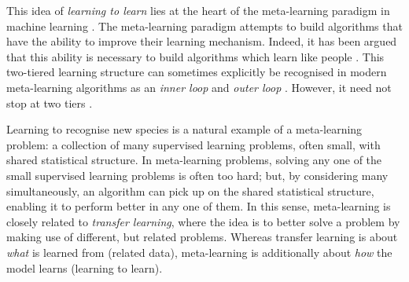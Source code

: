 \documentclass[12pt, twoside]{report}
\begin{document}
This idea of \emph{learning to learn} lies at the heart of the meta-learning paradigm in machine learning \parencite{Schmidhuber:1987:Evolutionary_Principles_in_Self-Referential_Learning,Thrun:1998:Learning_to_Learn}.
The meta-learning paradigm attempts to build algorithms that have the ability to improve their learning mechanism.
Indeed, it has been argued that this ability is necessary to build algorithms which learn like people \parencite{Lake:2015:Human-Level_Concept_Learning_Through_Probabilistic,Lake:2017:Building_Machines_That_Learn_and}.
This two-tiered learning structure can sometimes explicitly be recognised in modern meta-learning algorithms as an \emph{inner loop} and \emph{outer loop} \parencite{Andrychowicz:2016:Learning_to_Learn_by_Gradient,Finn:2017:Model-Agnostic_Meta-Learning_for_Fast_Adaptation,Grant:2018:Recasting_Gradient-Based_Meta-Learning_as_Hierarchical}.
However, it need not stop at two tiers \parencite{Schmidhuber:1987:Evolutionary_Principles_in_Self-Referential_Learning}.

Learning to recognise new species is a natural example of a meta-learning problem:
a collection of many supervised learning problems, often small, with shared statistical structure.
In meta-learning problems, solving any one of the small supervised learning problems is often too hard; but, by considering many simultaneously, an algorithm can pick up on the shared statistical structure, enabling it to perform better in any one of them.
In this sense, meta-learning is closely related to \emph{transfer learning}, where the idea is to better solve a problem by making use of different, but related problems.
Whereas transfer learning is about \emph{what} is learned from (related data),
meta-learning is additionally about \emph{how} the model learns (learning to learn).
\end{document}
